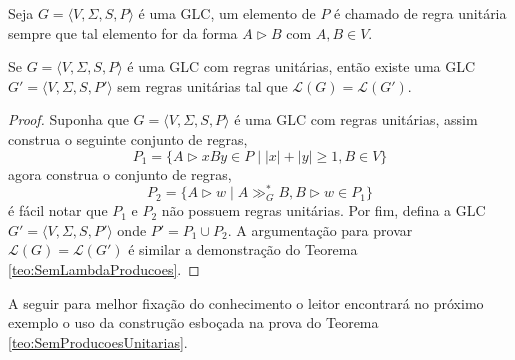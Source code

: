 \begin{definition}\label{def:RegraUnitaria}
    Seja $G = \langle V, \Sigma, S, P\rangle$ é uma GLC, um elemento de $P$ é chamado de regra unitária sempre que tal elemento for da forma $A \rhd B$ com $A, B \in V$.
\end{definition}

\begin{theorem}\label{teo:SemProducoesUnitarias}
    Se $G = \langle V, \Sigma, S, P\rangle$ é uma GLC com regras unitárias, então existe uma GLC $G' = \langle V, \Sigma, S, P'\rangle$ sem regras unitárias tal que $\mathcal{L}(G) = \mathcal{L}(G')$.
\end{theorem}

\begin{proof}
    Suponha que $G = \langle V, \Sigma, S, P\rangle$ é uma GLC com regras unitárias, assim construa o seguinte conjunto de regras,
    $$P_1 = \{A \rhd xBy \in P \mid |x| + |y| \geq 1, B \in V\}$$
    agora construa o conjunto de regras,
    $$P_2 = \{A \rhd w \mid A \gg^*_G B, B \rhd w \in P_1\}$$
    é fácil notar que $P_1$ e $P_2$ não possuem regras unitárias. Por fim, defina a GLC $G' = \langle V, \Sigma, S, P'\rangle$ onde $P' = P_1 \cup P_2$.  A argumentação para provar $\mathcal{L}(G) = \mathcal{L}(G')$ é similar a demonstração do Teorema \ref{teo:SemLambdaProducoes}.
\end{proof}

A seguir para melhor fixação do conhecimento o leitor encontrará no próximo exemplo o uso da construção esboçada na prova do Teorema \ref{teo:SemProducoesUnitarias}.

